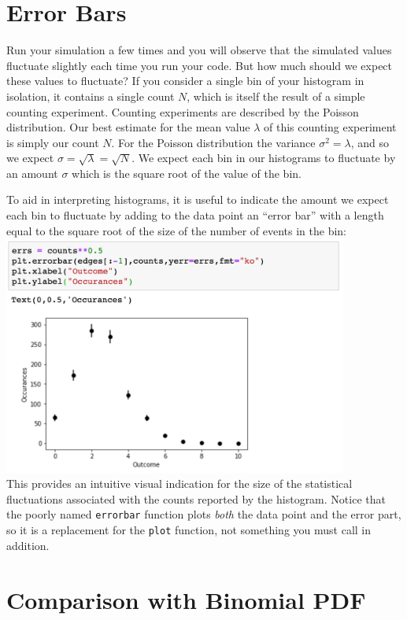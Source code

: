 \section{Error Bars}

Run your simulation a few times and you will observe that the
simulated values fluctuate slightly each time you run your code.  But
how much should we expect these values to fluctuate?  If you consider
a single bin of your histogram in isolation, it contains a single
count $N$, which is itself the result of a simple counting experiment.
Counting experiments are described by the Poisson distribution.  Our
best estimate for the mean value $\lambda$ of this counting experiment
is simply our count $N$.  For the Poisson distribution the variance
$\sigma^2=\lambda$, and so we expect $\sigma = \sqrt{\lambda} =
\sqrt{N}$.  We expect each bin in our histograms to fluctuate by an
amount $\sigma$ which is the square root of the value of the bin.

To aid in interpreting histograms, it is useful to indicate the amount
we expect each bin to fluctuate by adding to the data point an ``error
bar'' with a length equal to the square root of the size of the number
of events in the
bin:\\ 
\includegraphics[width=0.85\textwidth]{figs/labs/distributions/plotbars.png}\\ 
This provides an intuitive visual indication for the size of the
statistical fluctuations associated with the counts reported by the
histogram.  Notice that the poorly named {\tt errorbar} function plots
{\em both} the data point and the error part, so it is a replacement
for the {\tt plot} function, not something you must call in addition.

\section{Comparison with Binomial PDF}

